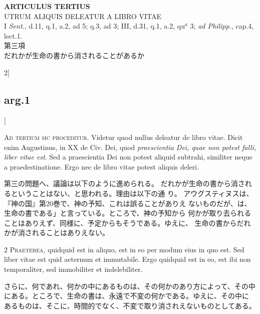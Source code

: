 \documentclass[paper=a4paper,fontsize=10pt,jafontsize=9pt,titlepage]{jlreq}
\begin{document}
\begin{center}
 {\Large {\bfseries ARTICULUS TERTIUS}}\\
 {\large UTRUM ALIQUIS DELEATUR A LIBRO VITAE}\\
 {\footnotesize I {\itshape Sent.}, d.11, q.1, a.2, ad 5; q.3, ad 3;
 III, d.31, q.1, a.2, qu$^a$ 3; {\itshape ad Philipp.}, cap.4, lect.1.}\\
 {\Large 第三項\\だれかが生命の書から消されることがあるか}
\end{center}

\begin{paracol}{2}[\subsection{arg.1}]

{\Huge A}{\scshape d tertium sic proceditur}. Videtur quod
nullus deleatur de libro vitae. Dicit enim Augustinus, in XX de
Civ. Dei, quod {\itshape praescientia Dei, quae non potest falli, liber vitae
est}. Sed a praescientia Dei non potest aliquid subtrahi, similiter neque
a praedestinatione. Ergo nec de libro vitae potest aliquis deleri.

\switchcolumn

第三の問題へ、議論は以下のように進められる。
だれかが生命の書から消されるということはない、と思われる。理由は以下の通
 り。
アウグスティヌスは、『神の国』第20巻で、神の予知、これは誤ることがありえ
 ないものだが、は、生命の書である」と言っている。ところで、神の予知から
 何かが取り去られることはありえず、同様に、予定からもそうである。ゆえに、
 生命の書からだれかが消されることはありえない。


{\scshape 2 Praeterea}, quidquid est in aliquo, est in
eo per modum eius in quo est. Sed liber vitae est quid aeternum et
immutabile. Ergo quidquid est in eo, est ibi non temporaliter, sed
immobiliter et indelebiliter.

\switchcolumn

さらに、何であれ、何かの中にあるものは、その何かのあり方によって、その中
 にある。ところで、生命の書は、永遠で不変の何かである。ゆえに、その中に
 あるものは、そこに、時間的でなく、不変で取り消されえないものとしてある。



\end{paracol}
\end{document}
